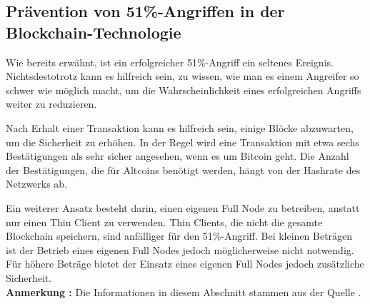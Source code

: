 \subsection{Prävention von 51\%-Angriffen in der Blockchain-Technologie}
Wie bereits erwähnt, ist ein erfolgreicher 51\%-Angriff ein seltenes Ereignis. Nichtsdestotrotz kann es hilfreich sein, zu wissen, wie man es einem Angreifer so schwer wie möglich macht, um die Wahrscheinlichkeit eines erfolgreichen Angriffs weiter zu reduzieren.

Nach Erhalt einer Transaktion kann es hilfreich sein, einige Blöcke abzuwarten, um die Sicherheit zu erhöhen. In der Regel wird eine Transaktion mit etwa sechs Bestätigungen als sehr sicher angesehen, wenn es um Bitcoin geht. Die Anzahl der Bestätigungen, die für Altcoins benötigt werden, hängt von der Hashrate des Netzwerks ab.

Ein weiterer Ansatz besteht darin, einen eigenen Full Node zu betreiben, anstatt nur einen Thin Client zu verwenden. Thin Clients, die nicht die gesamte Blockchain speichern, sind anfälliger für den 51\%-Angriff. Bei kleinen Beträgen ist der Betrieb eines eigenen Full Nodes jedoch möglicherweise nicht notwendig. Für höhere Beträge bietet der Einsatz eines eigenen Full Nodes jedoch zusätzliche Sicherheit. \\
\textbf{Anmerkung : } Die Informationen in diesem Abschnitt stammen aus der Quelle \cite{51attack}.
